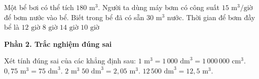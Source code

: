 \begin{ex} %
Một bể bơi có thể tích $180\text{ m}^3$. Người ta dùng máy bơm có công suất $15\text{ m}^3/\text{giờ}$ để bơm nước vào bể. Biết trong bể đã có sẵn $30\text{ m}^3$ nước. Thời gian để bơm đầy bể là
\choice
{$12\text{ giờ}$}
{$8\text{ giờ}$}
{$14\text{ giờ}$}
{\True $10\text{ giờ}$}
\end{ex}

\textbf{Phần 2. Trắc nghiệm đúng sai}

\begin{ex} %
Xét tính đúng sai của các khẳng định sau:
\choiceTF
{\True $1\text{ m}^3 = 1\,000\text{ dm}^3 = 1\,000\,000\text{ cm}^3$.}
{$0{,}75\text{ m}^3 = 75\text{ dm}^3$.}
{\True $2\text{ m}^3\; 50\text{ dm}^3 = 2{,}05\text{ m}^3$.}
{\True $12\,500\text{ dm}^3 = 12{,}5\text{ m}^3$.}
\end{ex}

